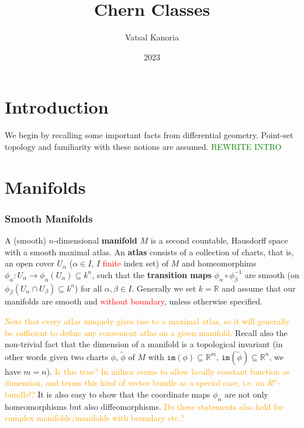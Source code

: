 \documentclass[a4paper]{article}
\theoremstyle{definition} \newtheorem*{definition}{Definition}
\theoremstyle{definition} \newtheorem*{definitions}{Definitions}
\theoremstyle{plain} \newtheorem{theorem}{Theorem}[section]
\theoremstyle{plain} \newtheorem{proposition}[theorem]{Proposition}
\theoremstyle{plain} \newtheorem{corollary}[theorem]{Corollary}
\theoremstyle{plain} \newtheorem{lemma}[theorem]{Lemma}
\theoremstyle{plain} \newtheorem{example}[theorem]{Example}
\newcommand{\checkCorrect}[1]{\textcolor{red}{#1}}
\newcommand{\understandBetter}[1]{\textcolor{orange}{#1}}
\newcommand{\question}[1]{\textcolor{orange}{#1}}
\newcommand{\finish}[1]{\textcolor{green}{#1}}
\newcommand{\defn}[1]{\textbf{#1}}
\newcommand{\realnos}{\mathbb{R}}
\begin{document}
\title{Chern Classes}
\author{Vatsal Kanoria}
\date{2023}
\maketitle

\tableofcontents

\section{Introduction}

We begin by recalling some important facts from differential geometry. Point-set topology and familiarity with these notions are assumed.
\finish{REWRITE INTRO}

\section{Manifolds}

\subsubsection{Smooth Manifolds}

A (smooth) $n$-dimensional \defn{manifold} $M$ is a second countable, Hausdorff space with a smooth maximal atlas. An \defn{atlas} consists of a collection of charts, that is, an open cover $U_\alpha$ ($\alpha\in I$, $I$ \checkCorrect{finite} index set) of $M$ and homeomorphims $\phi_\alpha:U_\alpha \to \phi_\alpha(U_\alpha) \subseteq k^n$, such that the \defn{transition maps} $\phi_\alpha \circ \phi_\beta^{-1}$ are smooth (on $\phi_\beta(U_\alpha \cap U_\beta)\subseteq k^n$) for all $\alpha, \beta\in I$. Generally we set $k=\realnos$ and assume that our manifolds are smooth and \checkCorrect{without boundary}, unless otherwise specified. 

\understandBetter{Note that every atlas uniquely gives rise to a maximal atlas, so it will generally be sufficient to define any convenient atlas on a given manifold.} Recall also the non-trivial fact that the dimension of a manifold is a topological invariant (in other words given two charts $\phi$, $\tilde{\phi}$ of $M$ with $\mathtt{im}(\phi)\subseteq \realnos^m$, $\mathtt{im}(\tilde{\phi})\subseteq \realnos^n$, we have $m=n$). \question{Is this true? In milnor seems to allow locally constant function as dimension, and terms this kind of vector bundle as a special case, i.e. an $R^n$-bundle!?} It is also easy to show that the coordinate maps $\phi_\alpha$ are not only homeomorphisms but also diffeomorphisms. \question{Do these statements also hold for complex manifolds/manifolds with boundary etc.?}
\end{document}

